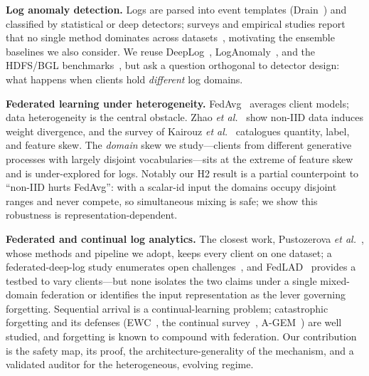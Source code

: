 \documentclass[conference]{IEEEtran}
\begin{document}
\textbf{Log anomaly detection.} Logs are parsed into event templates (Drain~\cite{he2017drain}) and
classified by statistical or deep detectors; surveys and empirical studies report that no single method
dominates across datasets~\cite{landauer2023survey}, motivating the ensemble baselines we also consider.
We reuse DeepLog~\cite{du2017deeplog}, LogAnomaly~\cite{meng2019loganomaly}, and the HDFS/BGL
benchmarks~\cite{zhu2023loghub}, but ask a question orthogonal to detector design: what happens when
clients hold \emph{different} log domains.

\textbf{Federated learning under heterogeneity.} FedAvg~\cite{mcmahan2017communication} averages client
models; data heterogeneity is the central obstacle. Zhao \emph{et al.}~\cite{zhao2018federated} show
non-IID data induces weight divergence, and the survey of Kairouz \emph{et al.}~\cite{kairouz2021advances}
catalogues quantity, label, and feature skew. The \emph{domain} skew we study---clients from different
generative processes with largely disjoint vocabularies---sits at the extreme of feature skew and is
under-explored for logs. Notably our H2 result is a partial counterpoint to ``non-IID hurts FedAvg'':
with a scalar-id input the domains occupy disjoint ranges and never compete, so simultaneous mixing is
safe; we show this robustness is representation-dependent.

\textbf{Federated and continual log analytics.} The closest work, Pustozerova \emph{et
al.}~\cite{pustozerova2026lightweight}, whose methods and pipeline we adopt, keeps every client on one
dataset; a federated-deep-log study enumerates open challenges~\cite{fedlog2024openchallenges}, and
FedLAD~\cite{fedlad2025} provides a testbed to vary clients---but none isolates the two claims under a
single mixed-domain federation or identifies the input representation as the lever governing forgetting.
Sequential arrival is a continual-learning problem; catastrophic forgetting and its defenses
(EWC~\cite{kirkpatrick2017overcoming}, the continual survey~\cite{delange2022continual},
A-GEM~\cite{agem2019}) are well studied, and forgetting is known to compound with federation. Our
contribution is the safety map, its proof, the architecture-generality of the mechanism, and a validated
auditor for the heterogeneous, evolving regime.
\end{document}
